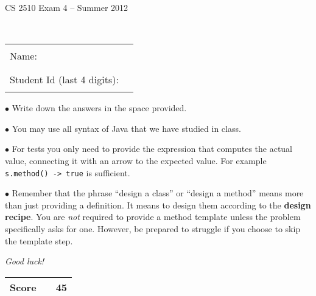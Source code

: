 \documentclass[11pt]{article}
\newcommand\code[1]{\texttt{#1}}
\newcounter{Pctr}
\begin{document}
\renewcommand{\theenumi}{\Alph{enumi}}
\setcounter{Pctr}{0}


\vfill
\centerline{\Large CS 2510 Exam 4 -- Summer 2012}

~\\[2cm]

\begin{center}
\begin{tabular}{l@{\qquad}l}
Name:                        & \rule{200pt}{.1pt} \\[.5cm]
Student Id (last 4 digits):  & \rule{200pt}{.1pt} \\[.5cm]
\end{tabular}
\end{center}

\noindent\begin{minipage}{7.5cm} $\bullet$ Write down the answers in the
space provided. 

$\bullet$ You may use all syntax of Java that we have studied in
class.

$\bullet$ For tests you only need to provide the expression that
computes the actual value, connecting it with an arrow to the expected
value. For example \code{s.method() -> true} is sufficient.

$\bullet$ Remember that the phrase ``design a class'' or ``design a
method'' means more than just providing a definition. It means to
design them according to the \textbf{design recipe}.  You are
\textit{not} required to provide a method template unless the problem
specifically asks for one.  However, be prepared to struggle if you
choose to skip the template step.

\bigskip

\textit{Good luck!}
\end{minipage}\hfil\begin{minipage}[t]{4.5cm}
\begin{tabular}{|c|l@{\qquad\qquad}|r|}
\hline
\textbf{Score} &  & 45 \\ \hline
\end{tabular}
\end{minipage}

\vfill\thispagestyle{empty}
\newpage
\end{document}
